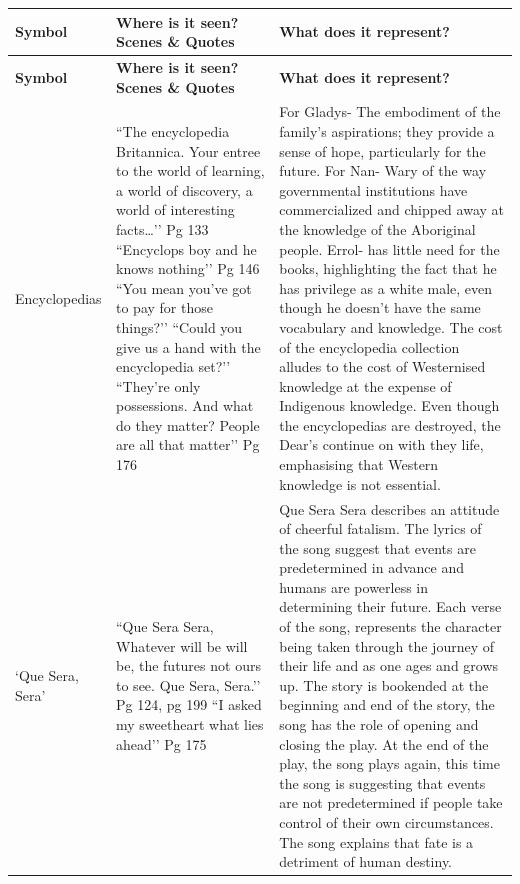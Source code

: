 \documentclass[a4paper]{article}
\begin{document}
    
\begin{longtable}{|p{2cm}|p{4cm}|p{7cm}|}
\hline
\textbf{Symbol} & \textbf{Where is it seen? Scenes \& Quotes} & \textbf{What does it represent?} \\
\hline
\endfirsthead

\hline
\textbf{Symbol} & \textbf{Where is it seen? Scenes \& Quotes} & \textbf{What does it represent?} \\
\hline
\endhead

Encyclopedias &
``The encyclopedia Britannica. Your entree to the world of learning, a world of discovery, a world of interesting facts…’’ Pg 133 \newline
``Encyclops boy and he knows nothing’’ Pg 146 \newline
``You mean you’ve got to pay for those things?’’ \newline
``Could you give us a hand with the encyclopedia set?’’ \newline
``They’re only possessions. And what do they matter? People are all that matter’’ Pg 176 &
For Gladys- The embodiment of the family’s aspirations; they provide a sense of hope, particularly for the future. \newline
For Nan- Wary of the way governmental institutions have commercialized and chipped away at the knowledge of the Aboriginal people. \newline
Errol- has little need for the books, highlighting the fact that he has privilege as a white male, even though he doesn’t have the same vocabulary and knowledge. \newline
The cost of the encyclopedia collection alludes to the cost of Westernised knowledge at the expense of Indigenous knowledge. Even though the encyclopedias are destroyed, the Dear’s continue on with they life, emphasising that Western knowledge is not essential. \\
\hline

‘Que Sera, Sera’ &
``Que Sera Sera, Whatever will be will be, the futures not ours to see. Que Sera, Sera.’’ Pg 124, pg 199 \newline
``I asked my sweetheart what lies ahead’’ Pg 175 &
Que Sera Sera describes an attitude of cheerful fatalism. The lyrics of the song suggest that events are predetermined in advance and humans are powerless in determining their future. Each verse of the song, represents the character being taken through the journey of their life and as one ages and grows up. The story is bookended at the beginning and end of the story, the song has the role of opening and closing the play. At the end of the play, the song plays again, this time the song is suggesting that events are not predetermined if people take control of their own circumstances. The song explains that fate is a detriment of human destiny. \\
\hline


\end{longtable}
\end{document}

